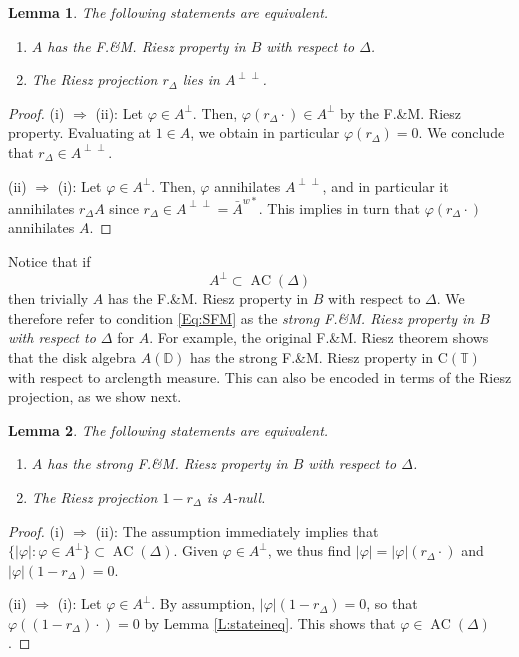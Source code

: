 \documentclass[10pt]{amsart}
\newcommand{\bD}{{\mathbb{D}}}
\newcommand{\bT}{{\mathbb{T}}}
\newcommand{\rC}{\mathrm{C}}
\renewcommand{\phi}{\varphi}
\newcommand{\AC}{\operatorname{AC}}
\newtheorem{lemma}{Lemma}[section]
\theoremstyle{definition}
\begin{document}
 \begin{lemma}\label{L:FMRiesz}
The following statements are equivalent.
 \begin{enumerate}[{\rm (i)}]
\item $A$ has the F.\&M. Riesz property in $B$ with respect to $\Delta$.
\item The Riesz projection $r_\Delta$ lies in $A^{\perp\perp}$.
\end{enumerate} 
 \end{lemma}
 \begin{proof}
 (i) $\Rightarrow$ (ii): Let $\phi\in A^\perp$. Then, $\phi(r_\Delta\cdot)\in A^\perp$ by
  the F.\&M. Riesz property. Evaluating at $1\in A$, we obtain in particular $\phi(r_\Delta)=0$. We conclude that $r_\Delta\in A^{\perp\perp}$.
 
 (ii) $\Rightarrow$ (i): Let $\phi\in A^\perp$. Then, $\phi$ annihilates $A^{\perp\perp}$, and in particular it annihilates $r_\Delta A$ since $r_\Delta\in A^{\perp\perp}
 = \bar{A}^{w*}$. This implies in turn that $\phi(r_\Delta \cdot)$ annihilates $A$.
 \end{proof}

Notice that if 
\begin{equation}\label{Eq:SFM}
A^\perp\subset \AC(\Delta)
\end{equation} 
then trivially $A$ has the F.\&M. Riesz property in $B$ with respect to $\Delta$. We therefore refer to
condition \eqref{Eq:SFM} as the \emph{strong F.\&M. Riesz property in $B$ with respect to $\Delta$} for $A$. 
For example, the original  F.\&M. Riesz theorem shows that the disk algebra
$A(\bD)$ has the  strong F.\&M. Riesz property in $\rC(\bT)$  with respect to arclength measure. 
This can also be encoded in terms of the Riesz projection, as we show next.


 \begin{lemma}\label{L:SFMRiesz}
The following statements are equivalent.
 \begin{enumerate}[{\rm (i)}]
\item $A$ has the  strong F.\&M. Riesz property in $B$ with respect to $\Delta$.
\item The Riesz projection $1-r_\Delta$ is $A$-null.
\end{enumerate} 
 \end{lemma}
 \begin{proof}
(i) $\Rightarrow$ (ii): The assumption immediately implies that
$
\{|\phi|:\phi\in A^\perp\}\subset \AC(\Delta).
$
Given $\phi\in A^\perp$, we thus find $|\phi|=|\phi|(r_\Delta\cdot)$ and $|\phi|(1-r_\Delta)=0$.



(ii) $\Rightarrow$ (i): 
Let $\phi\in A^\perp$. By assumption, $|\phi|(1-r_\Delta)=0$, so that $\phi((1-r_\Delta)\cdot)=0$ by Lemma \ref{L:stateineq}. This shows that $\phi\in \AC(\Delta)$.
\end{proof}
\end{document}
